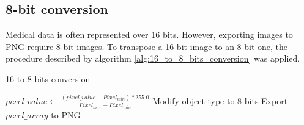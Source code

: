 \subsection{8-bit conversion}

Medical data is often represented over 16 bits. However, exporting images to PNG require 8-bit images. To transpose a 16-bit image to an 8-bit one, the procedure described by algorithm \ref{alg:16_to_8_bits_conversion} was applied. 

\begin{algorithm}
    \caption{16 to 8 bits conversion}
    \label{alg:16_to_8_bits_conversion}
    \begin{algorithmic}[1] %
        			\State $pixel\_value \gets \frac{(pixel\_value - Pixel_{min}) * 255.0}{Pixel_{max} - Pixel_{min}}$
        		\EndFor
        		\State Modify object type to 8 bits
        		\State Export $pixel\_array$ to PNG
        \EndProcedure
    \end{algorithmic}
\end{algorithm}